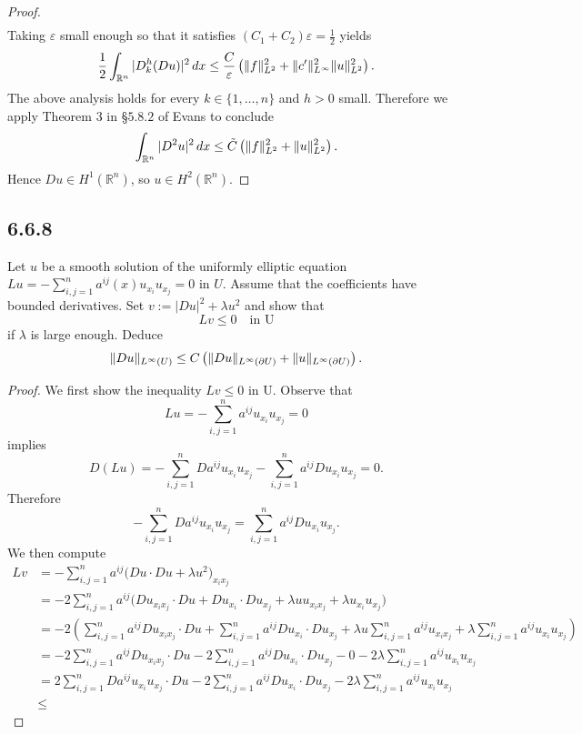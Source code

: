 \documentclass{article}
\DeclarePairedDelimiter{\norm}{\lVert}{\rVert}
\begin{document}
\begin{flushleft}
\begin{proof}
\begin{align*}
\end{align*}
Taking $\varepsilon$ small enough so that it satisfies $(C_1+C_2)\varepsilon=\frac{1}{2}$ yields
$$\frac{1}{2}\int_{\mathbb R^n} |D_k^h(Du)|^2\,dx \le \frac{C}{\varepsilon}\left(\norm{f}_{L^2}^2 + \norm{c'}_{L^{\infty}}^2 \norm{u}_{L^2}^2\right).$$
The above analysis holds for every $k\in\{1,\ldots,n\}$ and $h>0$ small. Therefore we apply Theorem $3$ in  §$5.8.2$ of Evans to conclude
$$\int_{\mathbb R^n} |D^2u|^2 \,dx\le \tilde{C}\left(\norm{f}_{L^2}^2 +  \norm{u}_{L^2}^2\right). $$
Hence $Du\in H^1(\mathbb R^n)$, so $u\in H^2(\mathbb R^n)$. 

\end{proof}
\subsection{\textbf{6.6.8}} Let $u$ be a smooth solution of the uniformly elliptic equation $Lu=-\sum_{i,j=1}^n a^{ij}(x)u_{x_i}u_{x_j}=0$ in $U$. Assume that the coefficients have bounded derivatives. 
Set $v:=|Du|^2+\lambda u^2$ and show that
$$Lv\le 0 \quad \text{in U}$$
if $\lambda$ is large enough. Deduce
$$\norm{Du}_{L^{\infty}(U)}\le C\left(\norm{Du}_{L^{\infty}(\partial U)}+\norm{u}_{L^{\infty}(\partial U)}\right).$$
\begin{proof}
We first show the inequality $Lv\le 0$ in U. Observe that
$$Lu=-\sum_{i,j=1}^n a^{ij}u_{x_i}u_{x_j}=0$$
implies
$$D(Lu)=-\sum_{i,j=1}^n Da^{ij}u_{x_i}u_{x_j} - \sum_{i,j=1}^n a^{ij}Du_{x_i}u_{x_j}=0.$$
Therefore
$$-\sum_{i,j=1}^n Da^{ij}u_{x_i}u_{x_j} = \sum_{i,j=1}^n a^{ij}Du_{x_i}u_{x_j}.$$
We then compute
\begin{align*}
Lv &= -\sum_{i,j=1}^n a^{ij}\Big(Du\cdot Du + \lambda u^2\Big)_{x_ix_j}    \\&=
-2\sum_{i,j=1}^n a^{ij}\Big(Du_{x_ix_j}\cdot Du + Du_{x_i}\cdot Du_{x_j} + \lambda uu_{x_ix_j}+ \lambda u_{x_i}u_{x_j}\Big)\\&=
-2\left(\sum_{i,j=1}^n a^{ij}Du_{x_ix_j}\cdot Du + \sum_{i,j=1}^n a^{ij}Du_{x_i}\cdot Du_{x_j} + \lambda u \sum_{i,j=1}^n a^{ij}u_{x_ix_j} +\lambda \sum_{i,j=1}^n a^{ij}u_{x_i}u_{x_j}\right)\\&=
-2\sum_{i,j=1}^n a^{ij}Du_{x_ix_j}\cdot Du - 2\sum_{i,j=1}^n a^{ij}Du_{x_i}\cdot Du_{x_j}-0-2\lambda\sum_{i,j=1}^n a^{ij}u_{x_i}u_{x_j}\\&=
2\sum_{i,j=1}^n Da^{ij}u_{x_i}u_{x_j}\cdot Du - 2\sum_{i,j=1}^n a^{ij}Du_{x_i}\cdot Du_{x_j}-2\lambda\sum_{i,j=1}^n a^{ij}u_{x_i}u_{x_j}\\&\le

\end{align*}
\end{proof}
\end{flushleft}
\end{document}
